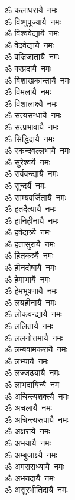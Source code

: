 \begin{flushleft}
\begin{multicols}{2}
ॐ कलाधरायै~नमः\hfill{}\\
ॐ विष्णुपूज्यायै~नमः\\
ॐ विश्ववेद्यायै~नमः\\
ॐ वेदवेद्यायै~नमः\\
ॐ वज्रिजातायै~नमः\\
ॐ वरप्रदायै~नमः\\
ॐ विशाखकान्तायै~नमः\\
ॐ विमलायै~नमः\\
ॐ विशालाक्ष्यै~नमः\\
ॐ सत्यसन्धायै~नमः\\
ॐ सत्प्रभावायै~नमः\hfill{}\\
ॐ सिद्धिदायै~नमः\\
ॐ स्कन्दवल्लभायै~नमः\\
ॐ सुरेश्वर्यै~नमः\\
ॐ सर्ववन्द्यायै~नमः\\
ॐ सुन्दर्यै~नमः\\
ॐ साम्यवर्जितायै~नमः\\
ॐ हतदैत्यायै~नमः\\
ॐ हानिहीनायै~नमः\\
ॐ हर्षदात्र्यै~नमः\\
ॐ हतासुरायै~नमः\hfill{}\\
ॐ हितकर्त्र्यै~नमः\\
ॐ हीनदोषायै~नमः\\
ॐ हेमाभायै~नमः\\
ॐ हेमभूषणायै~नमः\\
ॐ लयहीनायै~नमः\\
ॐ लोकवन्द्यायै~नमः\\
ॐ ललितायै~नमः\\
ॐ ललनोत्तमायै~नमः\\
ॐ लम्बवामकरायै~नमः\\
ॐ लभ्यायै~नमः\hfill{}\\
ॐ लज्जढ्यायै~नमः\\
ॐ लाभदायिन्यै~नमः\\
ॐ अचिन्त्यशक्त्यै~नमः\\
ॐ अचलायै~नमः\\
ॐ अचिन्त्यरूपायै~नमः\\
ॐ अक्षरायै~नमः\\
ॐ अभयायै~नमः\\
ॐ अम्बुजाक्ष्यै~नमः\\
ॐ अमराराध्यायै~नमः\\
ॐ अभयदायै~नमः\hfill{}\\
ॐ असुरभीतिदायै~नमः\\

\end{multicols}
\end{flushleft}
